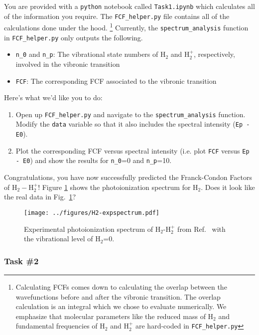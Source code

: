 \documentclass[12pt]{article}
\begin{document}
You are provided with a \texttt{python} notebook called \texttt{Task1.ipynb} which calculates all of the information you require. The \texttt{FCF\_helper.py} file contains all of the calculations done under the hood. \footnote{Calculating FCFs comes down to calculating the overlap between the wavefunctions before and after the vibronic transition. The overlap calculation is an integral which we chose to evaluate numerically. We emphasize that molecular parameters like the reduced mass of H$_2$ and fundamental frequencies of H$_2$ and H$_2^+$ are hard-coded in \texttt{FCF\_helper.py}} Currently, the \texttt{spectrum\_analysis} function in \texttt{FCF\_helper.py} only outputs the following.
\begin{itemize}
    \item \texttt{n\_0} and \texttt{n\_p}: The vibrational state numbers of H$_2$ and H$_2^+$, respectively, involved in the vibronic transition
    \item \texttt{FCF}: The corresponding FCF associated to the vibronic transition
\end{itemize}
Here's what we'd like you to do:
\begin{enumerate}
    \item Open up \texttt{FCF\_helper.py} and navigate to the \texttt{spectrum\_analysis} function. Modify the \texttt{data} variable so that it also includes the spectral intensity (\texttt{Ep - E0}).
    \item Plot the corresponding FCF versus spectral intensity (i.e. plot \texttt{FCF} versus \texttt{Ep - E0}) and show the results for \texttt{n\_0}=0 and \texttt{n\_p}=10.
\end{enumerate}

Congratulations, you have now successfully predicted the Franck-Condon Factors of H$_2-$H$_2^+$! Figure \ref{fig:h2_spectrum} shows the photoionization spectrum for H$_2$. Does it look like the real data in Fig.~\ref{fig:h2_spectrum}?

\begin{figure}
    \begin{center}
        \texttt{[image: ../figures/H2-expspectrum.pdf]}
    \end{center}
    \caption{
    Experimental photoionization spectrum of H$_2$-H$_2^+$ from Ref.~\cite{berkowitz1973comparison} with the vibrational level of H$_2$=0.
    }
    \label{fig:h2_spectrum}
\end{figure}

\subsubsection*{Task \#2}
\end{document}
